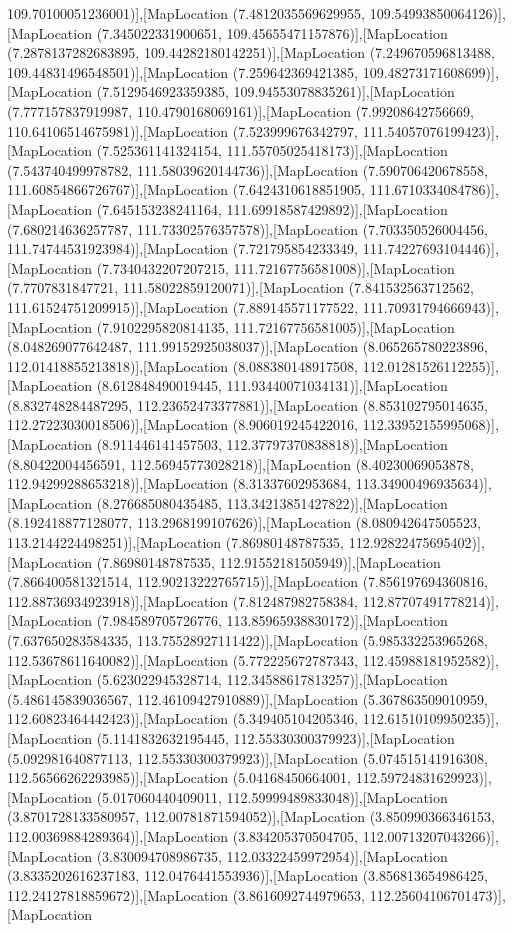 109.70100051236001)],[MapLocation (7.4812035569629955, 109.54993850064126)],[MapLocation (7.345022331900651, 109.45655471157876)],[MapLocation (7.2878137282683895, 109.44282180142251)],[MapLocation (7.249670596813488, 109.44831496548501)],[MapLocation (7.259642369421385, 109.48273171608699)],[MapLocation (7.5129546923359385, 109.94553078835261)],[MapLocation (7.777157837919987, 110.4790168069161)],[MapLocation (7.99208642756669, 110.64106514675981)],[MapLocation (7.523999676342797, 111.54057076199423)],[MapLocation (7.525361141324154, 111.55705025418173)],[MapLocation (7.543740499978782, 111.58039620144736)],[MapLocation (7.590706420678558, 111.60854866726767)],[MapLocation (7.6424310618851905, 111.6710334084786)],[MapLocation (7.645153238241164, 111.69918587429892)],[MapLocation (7.680214636257787, 111.73302576357578)],[MapLocation (7.703350526004456, 111.74744531923984)],[MapLocation (7.721795854233349, 111.74227693104446)],[MapLocation (7.7340432207207215, 111.72167756581008)],[MapLocation (7.7707831847721, 111.58022859120071)],[MapLocation (7.841532563712562, 111.61524751209915)],[MapLocation (7.889145571177522, 111.70931794666943)],[MapLocation (7.9102295820814135, 111.72167756581005)],[MapLocation (8.048269077642487, 111.99152925038037)],[MapLocation (8.065265780223896, 112.01418855213818)],[MapLocation (8.088380148917508, 112.01281526112255)],[MapLocation (8.612848490019445, 111.93440071034131)],[MapLocation (8.832748284487295, 112.23652473377881)],[MapLocation (8.853102795014635, 112.27223030018506)],[MapLocation (8.906019245422016, 112.33952155995068)],[MapLocation (8.911446141457503, 112.37797370838818)],[MapLocation (8.80422004456591, 112.56945773028218)],[MapLocation (8.40230069053878, 112.94299288653218)],[MapLocation (8.31337602953684, 113.34900496935634)],[MapLocation (8.276685080435485, 113.34213851427822)],[MapLocation (8.192418877128077, 113.2968199107626)],[MapLocation (8.080942647505523, 113.2144224498251)],[MapLocation (7.86980148787535, 112.92822475695402)],[MapLocation (7.86980148787535, 112.91552181505949)],[MapLocation (7.866400581321514, 112.90213222765715)],[MapLocation (7.856197694360816, 112.88736934923918)],[MapLocation (7.812487982758384, 112.87707491778214)],[MapLocation (7.984589705726776, 113.85965938830172)],[MapLocation (7.637650283584335, 113.75528927111422)],[MapLocation (5.985332253965268, 112.53678611640082)],[MapLocation (5.772225672787343, 112.45988181952582)],[MapLocation (5.623022945328714, 112.34588617813257)],[MapLocation (5.486145839036567, 112.46109427910889)],[MapLocation (5.367863509010959, 112.60823464442423)],[MapLocation (5.349405104205346, 112.61510109950235)],[MapLocation (5.1141832632195445, 112.55330300379923)],[MapLocation (5.092981640877113, 112.55330300379923)],[MapLocation (5.074515141916308, 112.56566262293985)],[MapLocation (5.04168450664001, 112.59724831629923)],[MapLocation (5.017060440409011, 112.59999489833048)],[MapLocation (3.8701728133580957, 112.00781871594052)],[MapLocation (3.850990366346153, 112.00369884289364)],[MapLocation (3.834205370504705, 112.00713207043266)],[MapLocation (3.830094708986735, 112.03322459972954)],[MapLocation (3.8335202616237183, 112.0476441553936)],[MapLocation (3.856813654986425, 112.24127818859672)],[MapLocation (3.8616092744979653, 112.25604106701473)],[MapLocation 